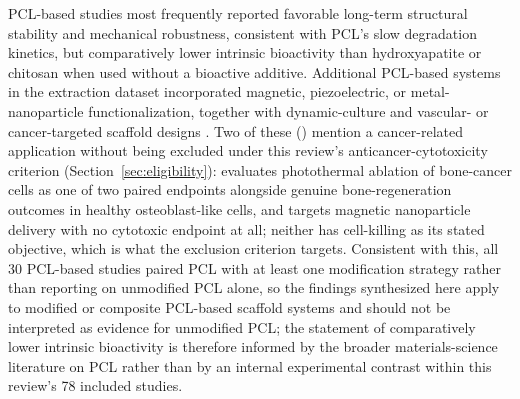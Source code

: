 \documentclass[5p,times,twocolumn]{elsarticle}
\begin{document}
PCL-based studies most frequently reported favorable long-term structural stability and mechanical robustness, consistent with PCL's slow degradation kinetics, but comparatively lower intrinsic bioactivity than hydroxyapatite or chitosan when used without a bioactive additive. Additional PCL-based systems in the extraction dataset incorporated magnetic, piezoelectric, or metal-nanoparticle functionalization, together with dynamic-culture and vascular- or cancer-targeted scaffold designs \cite{ref21,ref29,ref38,ref47,ref49,ref64}. Two of these (\cite{ref47,ref64}) mention a cancer-related application without being excluded under this review's anticancer-cytotoxicity criterion (Section~\ref{sec:eligibility}): \cite{ref64} evaluates photothermal ablation of bone-cancer cells as one of two paired endpoints alongside genuine bone-regeneration outcomes in healthy osteoblast-like cells, and \cite{ref47} targets magnetic nanoparticle delivery with no cytotoxic endpoint at all; neither has cell-killing as its stated objective, which is what the exclusion criterion targets. Consistent with this, all 30 PCL-based studies paired PCL with at least one modification strategy rather than reporting on unmodified PCL alone, so the findings synthesized here apply to modified or composite PCL-based scaffold systems and should not be interpreted as evidence for unmodified PCL; the statement of comparatively lower intrinsic bioactivity is therefore informed by the broader materials-science literature on PCL rather than by an internal experimental contrast within this review's 78 included studies.
\end{document}
